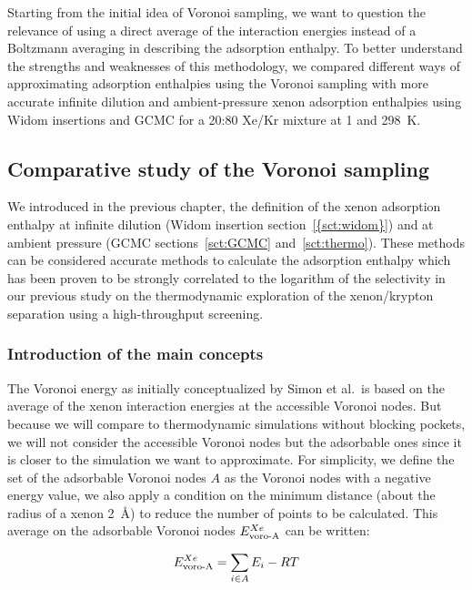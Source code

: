 \documentclass[main]{subfiles}
\begin{document}
Starting from the initial idea of Voronoi sampling, we want to question the relevance of using a direct average of the interaction energies instead of a Boltzmann averaging in describing the adsorption enthalpy. To better understand the strengths and weaknesses of this methodology, we compared different ways of approximating adsorption enthalpies using the Voronoi sampling with more accurate infinite dilution and ambient-pressure xenon adsorption enthalpies using Widom insertions and GCMC for a 20:80 Xe/Kr mixture at \SI{1}{\atm} and \SI{298}{\kelvin}.

\subsection{Comparative study of the Voronoi sampling}

We introduced in the previous chapter, the definition of the xenon adsorption enthalpy at infinite dilution (Widom insertion section~\ref{{sct:widom}}) and at ambient pressure (GCMC sections~\ref{sct:GCMC} and~\ref{sct:thermo}). These methods can be considered accurate methods to calculate the adsorption enthalpy which has been proven to be strongly correlated to the logarithm of the selectivity in our previous study on the thermodynamic exploration of the xenon/krypton separation using a high-throughput screening.

\subsubsection{Introduction of the main concepts}

The Voronoi energy as initially conceptualized by Simon et al.\ is based on the average of the xenon interaction energies at the accessible Voronoi nodes. But because we will compare to thermodynamic simulations without blocking pockets, we will not consider the accessible Voronoi nodes but the adsorbable ones since it is closer to the simulation we want to approximate. For simplicity, we define the set of the adsorbable Voronoi nodes $A$ as the Voronoi nodes with a negative energy value, we also apply a condition on the minimum distance (about the radius of a xenon \SI{2}{\angstrom}) to reduce the number of points to be calculated. This average on the adsorbable Voronoi nodes $E_{\text{voro-A}}^{Xe}$ can be written:

\begin{equation}
    E_{\text{voro-A}}^{Xe} = \sum_{i \in A} E_i -RT
\end{equation}
\end{document}
